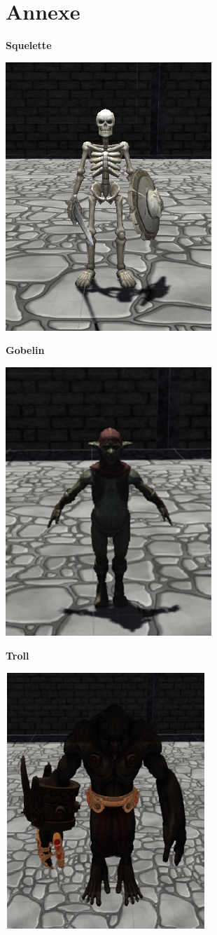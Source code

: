 \documentclass[a4paper, 12pt]{article}
\begin{document}
\section{Annexe}
\large \textbf{Squelette}\\
\centerline{\includegraphics[scale=0.8]{Skeleton.png}}
\large \textbf{Gobelin}\\
\smallbreak
\centerline{\includegraphics[scale=0.8]{Goblin.png}}
\bigbreak
\large \textbf{Troll}\\
\smallbreak
\centerline{\includegraphics[scale=0.8]{Troll.png}}
\end{document}
